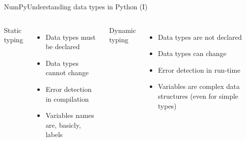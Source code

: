 \documentclass[10pt,compress]{beamer} %
\begin{document}
\begin{frame}{NumPy}{Understanding data types in Python (I)}

    \begin{columns}
			
			\begin{block}{\footnotesize{Static typing}}
			\vspace{-0.2cm} 
				
			\vspace{-0.2cm} 
			\end{block}

			\begin{itemize}
				\item Data types must be declared
				\item Data types cannot change
				\item Error detection in compilation
				\item Variables names are, basicly, labels
			\end{itemize}
			
			\begin{block}{\footnotesize{Dynamic typing}}
			\vspace{-0.2cm} 
				
			\vspace{-0.2cm} 
			\end{block}

			\begin{itemize}
				\item Data types are not declared
				\item Data types can change
				\item Error detection in run-time
				\item Variables are complex data structures (even for simple types)
			\end{itemize}
	\end{columns}
\end{frame}
\end{document}
